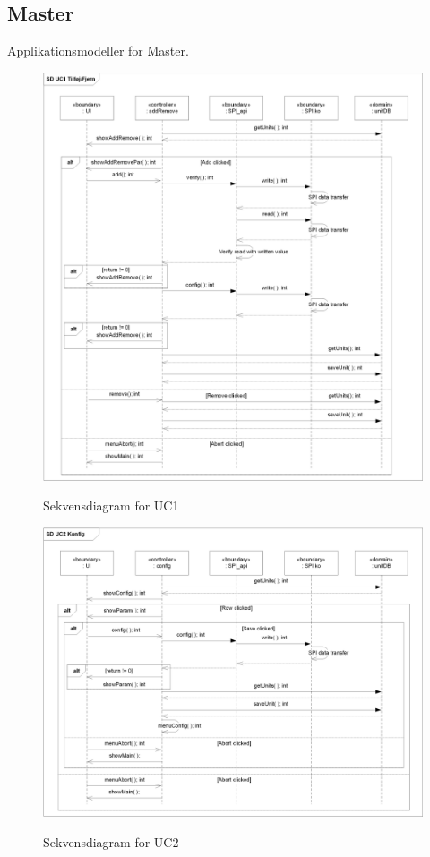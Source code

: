 
\subsection{Master}
Applikationsmodeller for Master.

\begin{figure}[htbp] \centering
{\includegraphics[scale=0.8]{filer/design/a_uc1}}
\caption{Sekvensdiagram for UC1}
\label{fig:Sekvensdiagram UC1}
\end{figure} 

\begin{figure}[htbp] \centering
{\includegraphics[scale=0.8]{filer/design/a_uc2}}
\caption{Sekvensdiagram for UC2}
\label{fig:Sekvensdiagram UC2}
\end{figure} 

